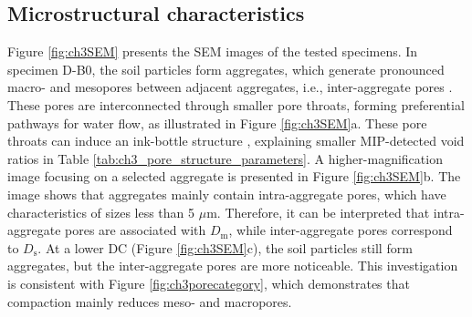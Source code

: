 \subsection{Microstructural characteristics}
Figure \ref{fig:ch3SEM} presents the \ac{SEM} images of the tested specimens. In specimen D-B0, the soil particles form aggregates, which generate pronounced macro- and mesopores between adjacent aggregates, i.e., inter-aggregate pores \parencite{muHydromechanicalBehaviorUnsaturated2023}. These pores are interconnected through smaller pore throats, forming preferential pathways for water flow, as illustrated in Figure \ref{fig:ch3SEM}a. These pore throats can induce an ink-bottle structure \parencite{phamStudyHysteresisModels2005, ngWaterRetentionVolumetric2016}, explaining smaller MIP-detected void ratios in Table \ref{tab:ch3_pore_structure_parameters}. A higher-magnification image focusing on a selected aggregate is presented in Figure \ref{fig:ch3SEM}b. The image shows that aggregates mainly contain intra-aggregate pores, which have characteristics of sizes less than 5 $\mu$m. Therefore, it can be interpreted that intra-aggregate pores are associated with $D_{\mathrm{m}}$, while inter-aggregate pores correspond to $D_{\mathrm{s}}$. At a lower \ac{DC} (Figure \ref{fig:ch3SEM}c), the soil particles still form aggregates, but the inter-aggregate pores are more noticeable. This investigation is consistent with Figure \ref{fig:ch3porecategory}, which demonstrates that compaction mainly reduces meso- and macropores.\par
